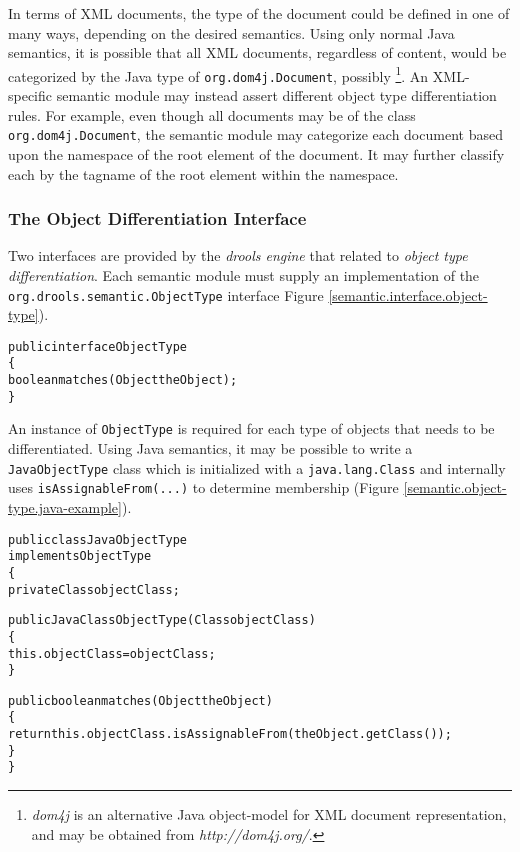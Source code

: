 \documentclass[10pt,twocolumn,letterpaper]{article}
\newenvironment{codelisting}%
	{\begin{minipage}{250pt}\small\begin{alltt}}%
	{\end{alltt}\end{minipage}}
\begin{document}
In terms of XML documents, the type of the document could be defined
in one of many ways, depending on the desired semantics.  Using only normal
Java semantics, it is possible that all XML documents, regardless of
content, would be categorized by the Java type of
\verb|org.dom4j.Document|, possibly%
	\footnote{\emph{dom4j} is an alternative Java object-model 
		for XML document representation, and may be obtained 
		from \emph{http://dom4j.org/}.}.
An XML-specific semantic module may instead assert different object
type differentiation rules.  For example, even though all documents
may be of the class \verb|org.dom4j.Document|, the semantic module
may categorize each document based upon the namespace of the root
element of the document.  It may further classify each by the tagname
of the root element within the namespace.

\subsubsection{The Object Differentiation Interface}

Two interfaces are provided by the \emph{drools engine} that related
to \emph{object type differentiation}.  Each semantic module must 
supply an implementation of the \verb|org.drools.semantic.ObjectType| 
interface Figure \ref{semantic.interface.object-type}).

\begin{figure*}[p]
	\begin{codelisting}
	public interface ObjectType
	\{
	     boolean matches(Object theObject);
	\}
	\end{codelisting}
	\caption{The \emph{ObjectType} interface.}
	\label{semantic.interface.object-type}
\end{figure*}

An instance of \verb|ObjectType| is required for each type of objects
that needs to be differentiated.  Using Java semantics, it may be
possible to write a \verb|JavaObjectType| class which is 
initialized with a \verb|java.lang.Class| and internally uses
\verb|isAssignableFrom(...)| to determine membership 
(Figure \ref{semantic.object-type.java-example}).

\begin{figure*}[p]
	\begin{codelisting}
	public class JavaObjectType 
	             implements ObjectType
	\{
	     private Class objectClass;

	     public JavaClassObjectType(Class objectClass)
	     \{
	          this.objectClass = objectClass;
	     \}

	     public boolean matches(Object theObject)
	     \{
	          return this.objectClass.isAssignableFrom( theObject.getClass() );
	     \}
	\}
	\end{codelisting}
	\caption{Example \emph{ObjectType} implementing Java class semantics, including polymorphism.} 
	\label{semantic.object-type.java-example}
\end{figure*}
\end{document}
